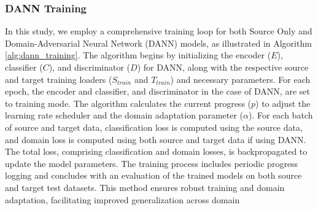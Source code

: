 \documentclass[conference]{IEEEtran}
\begin{document}
\subsubsection{DANN Training}
In this study, we employ a comprehensive training loop for both Source Only and Domain-Adversarial Neural Network (DANN) models, as illustrated in Algorithm \ref{alg:dann_training}. The algorithm begins by initializing the encoder ($E$), classifier ($C$), and discriminator ($D$) for DANN, along with the respective source and target training loaders ($S_{train}$ and $T_{train}$) and necessary parameters. For each epoch, the encoder and classifier, and discriminator in the case of DANN, are set to training mode. The algorithm calculates the current progress ($p$) to adjust the learning rate scheduler and the domain adaptation parameter ($\alpha$). For each batch of source and target data, classification loss is computed using the source data, and domain loss is computed using both source and target data if using DANN. The total loss, comprising classification and domain losses, is backpropagated to update the model parameters. The training process includes periodic progress logging and concludes with an evaluation of the trained models on both source and target test datasets. This method ensures robust training and domain adaptation, facilitating improved generalization across domain
\end{document}
